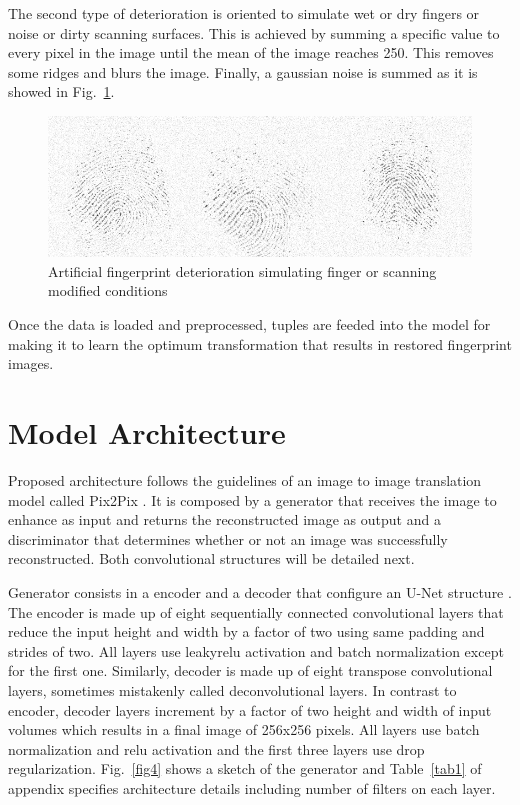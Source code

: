 \documentclass[a4paper,fleqn]{cas-dc}
\begin{document}
The second type of deterioration is oriented to simulate wet or dry fingers or noise or dirty scanning surfaces. This is achieved by summing a specific value to every pixel in the image until the mean of the image reaches 250. This removes some ridges and blurs the image. Finally, a gaussian noise is summed as it is showed in Fig.~\ref{fig3}.

\begin{figure}[htbp]
\centerline{\includegraphics[scale=0.32]{figs/deterioration_2.png}}
\caption{Artificial fingerprint deterioration simulating finger or scanning modified conditions}
\label{fig3}
\end{figure}

Once the data is loaded and preprocessed, tuples are feeded into the model for making it to learn the optimum transformation that results in restored fingerprint images.

\section{Model Architecture}
\label{sec:MA}

Proposed architecture follows the guidelines of an image to image translation model called Pix2Pix \cite{ITITAN}. It is composed by a generator that receives the image to enhance as input and returns the reconstructed image as output and a discriminator that determines whether or not an image was successfully reconstructed. Both convolutional structures will be detailed next.

Generator consists in a encoder and a decoder that configure an U-Net structure \cite{UNBIS}. The encoder is made up of eight sequentially connected convolutional layers that reduce the input height and width by a factor of two using same padding and strides of two. All layers use leakyrelu activation and batch normalization except for the first one. Similarly, decoder is made up of eight transpose convolutional layers, sometimes mistakenly called deconvolutional layers. In contrast to encoder, decoder layers increment by a factor of two height and width of input volumes which results in a final image of 256x256 pixels. All layers use batch normalization and relu activation and the first three layers use drop regularization. Fig.~\ref{fig4} shows a sketch of the generator and Table~\ref{tab1} of appendix specifies architecture details including number of filters on each layer.
\end{document}
